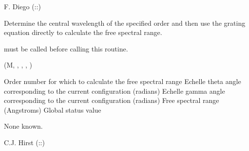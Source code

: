 \begin{manroutinedescription}
     F. Diego  {}  ({}::{})

\end{manroutinedescription}
\begin{manroutinedescription}
     Determine the central wavelength of the specified order and then
     use the grating equation directly to calculate the free spectral
     range.

     {} must be called before calling this routine.

     {} {} (M, {}, {}, %
{}, {})

\begin{manparametertable}
 Order number %
for which to calculate the
                                      free spectral range
Echelle theta angle corresponding to the
                                      current configuration (radians)
Echelle gamma angle corresponding to the
                                      current configuration (radians)
 Free %
spectral range (Angstroms)
 Global status value
\end{manparametertable}
     None known.

     C.J. Hirst  {}  ({}::{})

\end{manroutinedescription}
